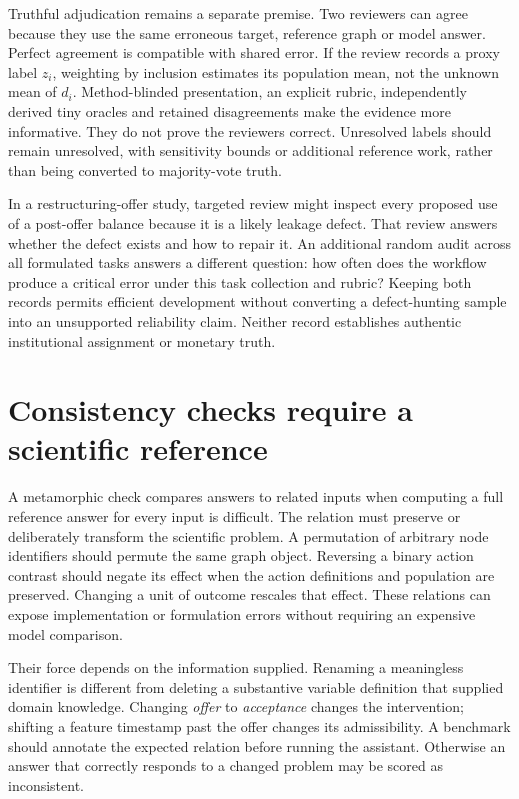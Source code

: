Truthful adjudication remains a separate premise. Two reviewers can agree
because they use the same erroneous target, reference graph or model
answer. Perfect agreement is compatible with shared error. If the review
records a proxy label \(z_i\), weighting by inclusion estimates its population
mean, not the unknown mean of \(d_i\). Method-blinded presentation, an
explicit rubric, independently derived tiny oracles and retained
disagreements make the evidence more informative. They do not prove the
reviewers correct. Unresolved labels should remain unresolved, with
sensitivity bounds or additional reference work, rather than being converted
to majority-vote truth.

In a restructuring-offer study, targeted review might inspect every proposed
use of a post-offer balance because it is a likely leakage defect. That
review answers whether the defect exists and how to repair it. An additional
random audit across all formulated tasks answers a different question:
how often does the workflow produce a critical error under this task
collection and rubric? Keeping both records permits efficient development
without converting a defect-hunting sample into an unsupported reliability
claim. Neither record establishes authentic institutional assignment or
monetary truth.

\section{Consistency checks require a scientific reference}
\label{exec14:l7-metamorphic}

A metamorphic check compares answers to related inputs when computing a full
reference answer for every input is difficult. The relation must preserve
or deliberately transform the scientific problem. A permutation of arbitrary
node identifiers should permute the same graph object. Reversing a binary
action contrast should negate its effect when the action definitions and
population are preserved. Changing a unit of outcome rescales that effect.
These relations can expose implementation or formulation errors without
requiring an expensive model comparison.

Their force depends on the information supplied. Renaming a meaningless
identifier is different from deleting a substantive variable definition
that supplied domain knowledge. Changing \emph{offer} to \emph{acceptance}
changes the intervention; shifting a feature timestamp past the offer changes
its admissibility. A benchmark should annotate the expected relation before
running the assistant. Otherwise an answer that correctly responds to a
changed problem may be scored as inconsistent.

